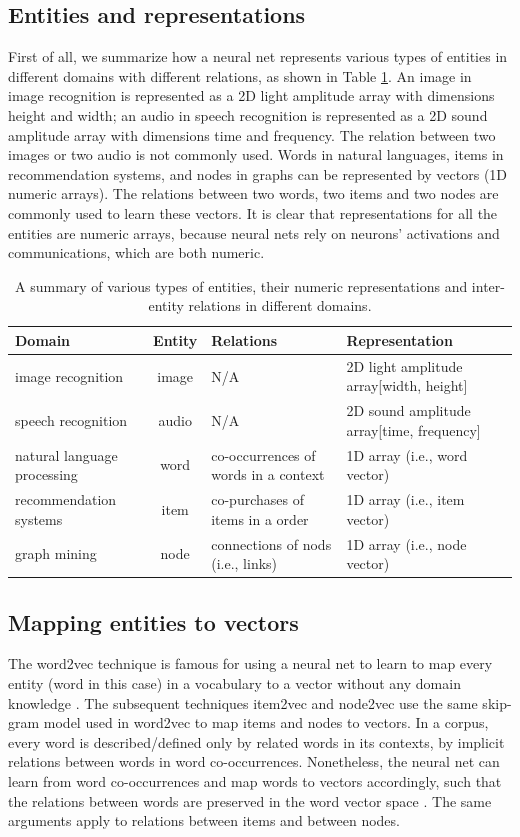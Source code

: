 \documentclass[conference]{IEEEtran}
\begin{document}
\subsection{Entities and representations}
First of all, we summarize how a neural net represents various types of 
entities in different domains with different relations, as shown in 
Table \ref{tab:domains}.
An image in image recognition is represented as a 2D light amplitude 
array with dimensions height and width; an audio in speech recognition 
is represented as a 2D sound amplitude array with dimensions time and 
frequency.
The relation between two images or two audio is not commonly used. 
Words in natural languages, items in recommendation systems, and nodes 
in graphs can be represented by vectors (1D numeric arrays).
The	relations between two words, two items and two nodes are commonly 
used to learn these vectors.
It is clear that representations for all the entities are numeric arrays, 
because neural nets rely on neurons' activations and communications, which 
are both numeric.
\begin{table}[!htb]
	\centering
	\caption{A summary of various types of entities, their numeric
		representations and inter-entity relations in different domains.
	}
	\begin{tabularx}{1\textwidth}{|X|c|X|X|} \hline \rowcolor{blue!40}
		Domain & Entity & Relations & Representation \\ \hline
		image recognition & image & N/A & 2D light amplitude array[width, height]      \\ \hline
		speech recognition & audio  & N/A & 2D sound amplitude array[time, frequency]    \\ \hline
		natural language processing & word   & co-occurrences of words in a context & 1D array (i.e., word vector) \\ \hline
		recommendation systems & item   & co-purchases of items in a order & 1D array (i.e., item vector) \\ \hline
		graph mining & node   & connections of nods (i.e., links) & 1D array (i.e., node vector) \\ \hline
	\end{tabularx}
	\label{tab:domains}
\end{table}

\subsection{Mapping entities to vectors}
The word2vec technique is famous for using a neural net to learn to map every 
entity (word in this case) in a vocabulary to a vector without any domain 
knowledge \cite{mikolov2013efficient}.
The subsequent techniques item2vec \cite{barkan2016item2vec}
and node2vec \cite{grovernode2vec} use the same skip-gram 
model used in word2vec to map items and nodes to vectors.
In a corpus, every word is described/defined only by related words in its 
contexts, by implicit relations between words in word co-occurrences.
Nonetheless, the neural net can learn from word co-occurrences and map words to 
vectors accordingly,
such that the relations between words are preserved in the word vector space 
\cite{mikolov2013distributed}.
The same arguments apply to relations between items and between nodes.
\end{document}
